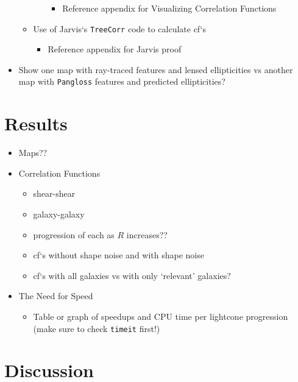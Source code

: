 \documentclass[%
 reprint,
 amsmath,amssymb,
 aps,
]{revtex4-1}
\begin{document}
\begin{itemize}
\begin{itemize}
\begin{itemize}
\begin{itemize}
                \item Reference appendix for Visualizing Correlation Functions
                \end{itemize}
            \end{itemize}
        \item Use of Jarvis`s \texttt{TreeCorr} code to calculate cf`s
        \begin{itemize}
            \item Reference appendix for Jarvis proof
        \end{itemize}
    \end{itemize}
\item Show one map with ray-traced features and lensed ellipticities vs another map with \texttt{Pangloss} features and predicted ellipticities?
\end{itemize}

\section{Results}

\begin{itemize}
\item Maps??
\item Correlation Functions
    \begin{itemize}
    \item shear-shear
    \item galaxy-galaxy
    \item progression of each as $R$ increases??
    \item cf`s without shape noise and with shape noise
    \item cf`s with all galaxies vs with only `relevant' galaxies?
    \end{itemize}
\item The Need for Speed
    \begin{itemize}
    \item Table or graph of speedups and CPU time per lightcone progression (make sure to check \texttt{timeit} first!)
    \end{itemize}
\end{itemize}

\section{Discussion}
\end{document}
